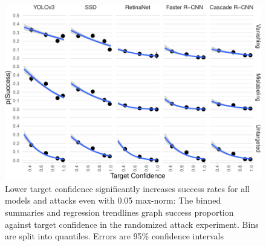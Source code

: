 \documentclass[
]{article}
\begin{document}
\begin{figure}[tb]

{\centering \includegraphics{imgs-normed/target_conf_graph-1} 

}

\caption{Lower target confidence significantly increases success rates for all models and attacks even with 0.05 max-norm:  The binned summaries and regression trendlines graph success proportion against target confidence in the randomized attack experiment. Bins are split into quantiles. Errors are 95\% confidence intervals}\label{fig:target_conf_graph}
\end{figure}

\begingroup\fontsize{9}{11}\selectfont
\end{document}
